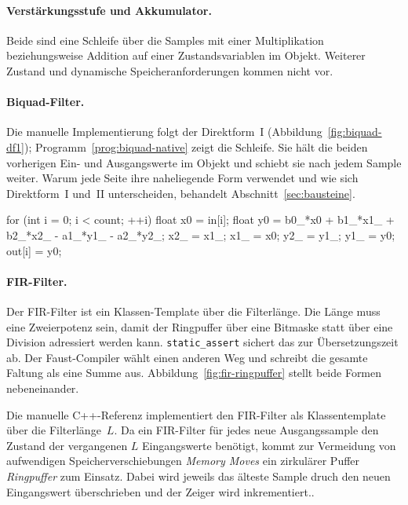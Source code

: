 \paragraph{Verstärkungsstufe und Akkumulator.}
Beide sind eine Schleife über die Samples mit einer Multiplikation beziehungsweise Addition auf einer Zustandsvariablen im Objekt. Weiterer Zustand und dynamische Speicheranforderungen kommen nicht vor.

\paragraph{Biquad-Filter.}
Die manuelle Implementierung folgt der Direktform~I (Abbildung~\ref{fig:biquad-df1}); Programm~\ref{prog:biquad-native} zeigt die Schleife. Sie hält die beiden vorherigen Ein- und Ausgangswerte im Objekt und schiebt sie nach jedem Sample weiter. Warum jede Seite ihre naheliegende Form verwendet und wie sich Direktform~I und~II unterscheiden, behandelt Abschnitt~\ref{sec:bausteine}.

\begin{program}
	\caption{Manuelle Biquad-Implementierung in Direktform~I}
	\label{prog:biquad-native}
	\begin{CCode}
		for (int i = 0; i < count; ++i) {
			float x0 = in[i];
			float y0 = b0_*x0 + b1_*x1_ + b2_*x2_ - a1_*y1_ - a2_*y2_;
			x2_ = x1_; x1_ = x0;
			y2_ = y1_; y1_ = y0;
			out[i] = y0;
		}
	\end{CCode}
\end{program}

\paragraph{FIR-Filter.}
Der FIR-Filter ist ein Klassen-Template über die Filterlänge. Die Länge muss eine Zweierpotenz sein, damit der Ringpuffer über eine Bitmaske statt über eine Division adressiert werden kann. \texttt{static\_assert} sichert das zur Übersetzungszeit ab. Der Faust-Compiler wählt einen anderen Weg und schreibt die gesamte Faltung als eine Summe aus. Abbildung~\ref{fig:fir-ringpuffer} stellt beide Formen nebeneinander.



Die manuelle C++-Referenz implementiert den FIR-Filter als Klassentemplate über die Filterlänge~$L$.  Da ein FIR-Filter für jedes neue Ausgangssample den Zustand der vergangenen $L$ Eingangswerte benötigt, kommt zur Vermeidung von aufwendigen Speicherverschiebungen \emph{Memory Moves} ein zirkulärer Puffer \emph{Ringpuffer} zum Einsatz. Dabei wird jeweils das älteste Sample druch den neuen Eingangswert überschrieben und der Zeiger wird inkrementiert..

